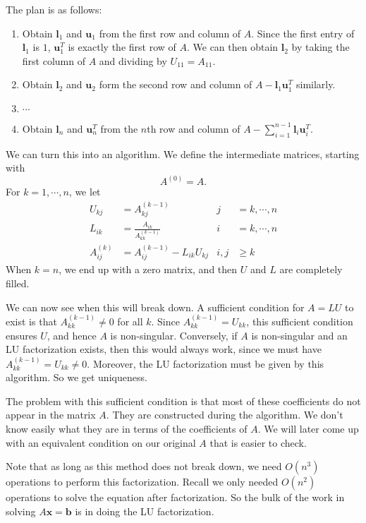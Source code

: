 \documentclass[a4paper]{article}
\begin{document}
The plan is as follows:
\begin{enumerate}
  \item Obtain $\mathbf{l}_1$ and $\mathbf{u}_1$ from the first row and column of $A$. Since the first entry of $\mathbf{l}_1$ is $1$, $\mathbf{u}_1^T$ is exactly the first row of $A$. We can then obtain $\mathbf{l}_2$ by taking the first column of $A$ and dividing by $U_{11} = A_{11}$.

  \item Obtain $\mathbf{l}_2$ and $\mathbf{u}_2$ form the second row and column of $A - \mathbf{l}_1 \mathbf{u}_1^T$ similarly.
  \item $\cdots$
  \item Obtain $\mathbf{l}_n$ and $\mathbf{u}_n^T$ from the $n$th row and column of $A - \sum_{i = 1}^{n - 1} \mathbf{l}_i \mathbf{u}_i^T$.
\end{enumerate}
We can turn this into an algorithm. We define the intermediate matrices, starting with
\[
  A^{(0)} = A.
\]
For $k = 1, \cdots, n$, we let
\begin{align*}
  U_{kj} &= A_{kj}^{(k - 1)} & j &=k, \cdots, n\\
  L_{ik} &= \frac{A_{ik}}{A_{kk}^{(k - 1)}} & i &= k, \cdots, n\\
  A_{ij}^{(k)} &= A_{ij}^{(k - 1)} - L_{ik} U_{kj} & i, j &\geq k
\end{align*}
When $k = n$, we end up with a zero matrix, and then $U$ and $L$ are completely filled.

We can now see when this will break down. A sufficient condition for $A = LU$ to exist is that $A_{kk}^{(k - 1)} \not= 0$ for all $k$. Since $A_{kk}^{(k - 1)} = U_{kk}$, this sufficient condition ensures $U$, and hence $A$ is non-singular. Conversely, if $A$ is non-singular and an LU factorization exists, then this would always work, since we must have $A_{kk}^{(k - 1)} = U_{kk} \not= 0$. Moreover, the LU factorization must be given by this algorithm. So we get uniqueness.

The problem with this sufficient condition is that most of these coefficients do not appear in the matrix $A$. They are constructed during the algorithm. We don't know easily what they are in terms of the coefficients of $A$. We will later come up with an equivalent condition on our original $A$ that is easier to check.

Note that as long as this method does not break down, we need $O(n^3)$ operations to perform this factorization. Recall we only needed $O(n^2)$ operations to solve the equation after factorization. So the bulk of the work in solving $A\mathbf{x} = \mathbf{b}$ is in doing the LU factorization.
\end{document}
